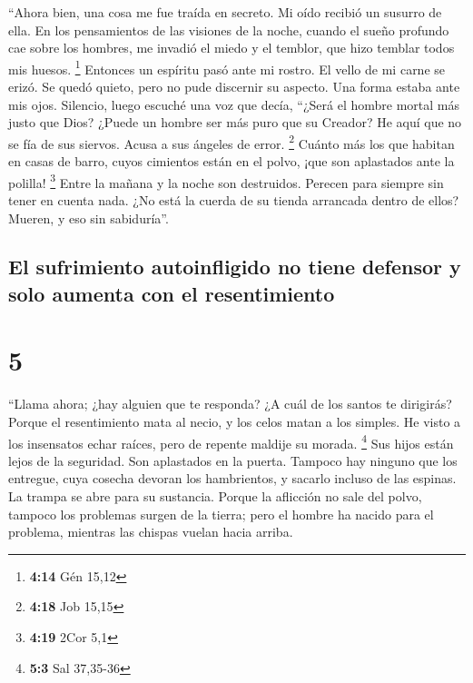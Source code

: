 ``Ahora bien, una cosa me fue traída en secreto. Mi oído
recibió un susurro de ella.  En los pensamientos de las
visiones de la noche, cuando el sueño profundo cae sobre los hombres,
 me invadió el miedo y el temblor, que hizo temblar todos
mis huesos. \footnote{\textbf{4:14} Gén 15,12}  Entonces
un espíritu pasó ante mi rostro. El vello de mi carne se erizó.
 Se quedó quieto, pero no pude discernir su aspecto. Una
forma estaba ante mis ojos. Silencio, luego escuché una voz que decía,
 ``¿Será el hombre mortal más justo que Dios? ¿Puede un
hombre ser más puro que su Creador?  He aquí que no se
fía de sus siervos. Acusa a sus ángeles de error. \footnote{\textbf{4:18}
  Job 15,15}  Cuánto más los que habitan en casas de
barro, cuyos cimientos están en el polvo, ¡que son aplastados ante la
polilla! \footnote{\textbf{4:19} 2Cor 5,1}  Entre la
mañana y la noche son destruidos. Perecen para siempre sin tener en
cuenta nada.  ¿No está la cuerda de su tienda arrancada
dentro de ellos? Mueren, y eso sin sabiduría''.

\hypertarget{el-sufrimiento-autoinfligido-no-tiene-defensor-y-solo-aumenta-con-el-resentimiento}{%
\subsection{El sufrimiento autoinfligido no tiene defensor y solo
aumenta con el
resentimiento}\label{el-sufrimiento-autoinfligido-no-tiene-defensor-y-solo-aumenta-con-el-resentimiento}}

\hypertarget{section-4}{%
\section{5}\label{section-4}}

 ``Llama ahora; ¿hay alguien que te responda? ¿A cuál de
los santos te dirigirás?  Porque el resentimiento mata al
necio, y los celos matan a los simples.  He visto a los
insensatos echar raíces, pero de repente maldije su morada. \footnote{\textbf{5:3}
  Sal 37,35-36}  Sus hijos están lejos de la seguridad.
Son aplastados en la puerta. Tampoco hay ninguno que los entregue,
 cuya cosecha devoran los hambrientos, y sacarlo incluso
de las espinas. La trampa se abre para su sustancia. 
Porque la aflicción no sale del polvo, tampoco los problemas surgen de
la tierra;  pero el hombre ha nacido para el problema,
mientras las chispas vuelan hacia arriba.

